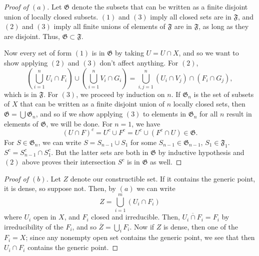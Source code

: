 \documentclass[10pt]{article}
\theoremstyle{definition}
\theoremstyle{remark}
\numberwithin{equation}{section}
\numberwithin{figure}{subsubsection}
\begin{document}
\begin{proof}[Proof of $(a)$]
  Let $\mathfrak{G}$ denote the subsets that can be written as a finite disjoint union of locally closed subsets. $(1)$ and $(3)$ imply all closed sets are in $\mathfrak{F}$, and $(2)$ and $(3)$ imply all finite unions of elements of $\mathfrak{F}$ are in $\mathfrak{F}$, as long as they are disjoint. Thus, $\mathfrak{G} \subset \mathfrak{F}$.
  \par Now every set of form $(1)$ is in $\mathfrak{G}$ by taking $U = U \cap X$, and so we want to show applying $(2)$ and $(3)$ don't affect anything. For $(2)$,
  \begin{equation*}
    \left( \bigcup_{i=1}^n U_i \cap F_i \right) \cup \left( \bigcup_{i=1}^n V_i \cap G_i \right) = \bigcup_{i,j=1}^n (U_i \cap V_j) \cap (F_i \cap G_j),
  \end{equation*}
  which is in $\mathfrak{F}$. For $(3)$, we proceed by induction on $n$. If $\mathfrak{G}_n$ is the set of subsets of $X$ that can be written as a finite disjoint union of $n$ locally closed sets, then $\mathfrak{G} = \bigcup \mathfrak{G}_n$, and so if we show applying $(3)$ to elements in $\mathfrak{G}_n$ for all $n$ result in elements of $\mathfrak{G}$, we will be done. For $n=1$, we have
  \begin{equation*}
    (U \cap F)^c = U^c \cup F^c = U^c \cup (F^c \cap U) \in \mathfrak{G}.
  \end{equation*}
  For $S \in \mathfrak{G}_n$, we can write $S = S_{n-1} \cup S_1$ for some $S_{n-1} \in \mathfrak{G}_{n-1}$, $S_1 \in \mathfrak{F}_1$. $S^c = S^c_{n-1} \cap S_1^c$. But the latter sets are both in $\mathfrak{G}$ by inductive hypothesis and $(2)$ above proves their intersection $S^c$ is in $\mathfrak{G}$ as well.
\end{proof}
\begin{proof}[Proof of $(b)$]
  Let $Z$ denote our constructible set. If it contains the generic point, it is dense, so suppose not. Then, by $(a)$ we can write
  \begin{equation*}
    Z = \bigcup_{i=1}^m (U_i \cap F_i)
  \end{equation*}
  where $U_i$ open in $X$, and $F_i$ closed and irreducible. Then, $\overline{U_i \cap F_i} = F_i$ by irreducibility of the $F_i$, and so $\overline{Z} = \bigcup_i F_i$. Now if $Z$ is dense, then one of the $F_i = X$; since any nonempty open set contains the generic point, we see that then $U_i \cap F_i$ contains the generic point. 
\end{proof}
\end{document}
